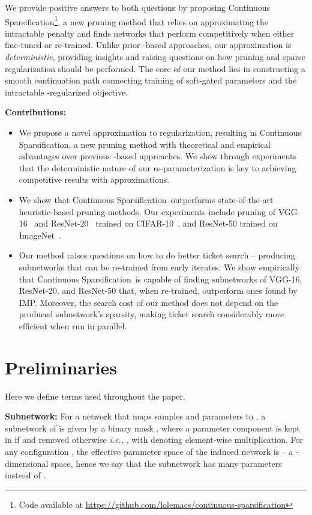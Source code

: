 \documentclass{article}
\newcommand{\citep}[1]{\cite{#1}}
\newcommand{\ie}{\textit{i.e.,} }
\newcommand{\method}{Continuous Sparsification}
\begin{document}
We provide positive answers to both questions by proposing \method\footnote[1]{Code available at \url{https://github.com/lolemacs/continuous-sparsification}}, a new pruning method that relies on approximating the intractable  penalty and finds networks that perform competitively when either fine-tuned or re-trained. Unlike prior -based approaches, our approximation is \emph{deterministic}, providing insights and raising questions on how pruning and sparse regularization should be performed. The core of our method lies in constructing a smooth continuation path \cite{contmethods} connecting training of soft-gated parameters and the intractable -regularized objective.

\textbf{Contributions:}
\vspace{-5pt}
\begin{itemize}[leftmargin=*]
\item{We propose a novel approximation to  regularization, resulting in \method, a new pruning method with theoretical and empirical advantages over previous -based approaches. We show through experiments that the deterministic nature of our re-parameterization is key to achieving competitive results with  approximations.}
\item{We show that \method~outperforms state-of-the-art heuristic-based pruning methods. Our experiments include pruning of VGG-16~\cite{vgg} and ResNet-20~\cite{resnet1} trained on CIFAR-10~\citep{cifar}, and ResNet-50 trained on ImageNet~\citep{imagenet}.}
\item{Our method raises questions on how to do better ticket search -- producing subnetworks that can be re-trained from early iterates. We show empirically that \method~is capable of finding subnetworks of VGG-16, ResNet-20, and ResNet-50 that, when re-trained, outperform ones found by IMP. Moreover, the search cost of our method does not depend on the produced subnetwork's sparsity, making ticket search considerably more efficient when run in parallel.}
\end{itemize}

\section{Preliminaries}

Here we define terms used throughout the paper.

\textbf{Subnetwork:} For a network  that maps samples  and parameters  to , a subnetwork  of  is given by a binary mask , where a parameter component  is kept in  if  and removed otherwise \ie , with  denoting element-wise multiplication. For any configuration , the effective parameter space of the induced network  is  -- a -dimensional space, hence we say that the subnetwork  has  many parameters instead of .
\end{document}
